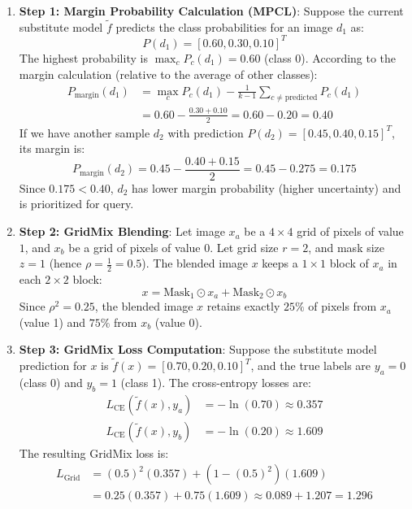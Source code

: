 \documentclass{article}
\begin{document}
\begin{enumerate}
    \item \textbf{Step 1: Margin Probability Calculation (MPCL)}: Suppose the current substitute model $\tilde{f}$ predicts the class probabilities for an image $d_1$ as:
    $$P(d_1) = [0.60, 0.30, 0.10]^T$$
    The highest probability is $\max_c P_c(d_1) = 0.60$ (class 0). 
    According to the margin calculation (relative to the average of other classes):
    \begin{align*}
        P_{\text{margin}}(d_1) &= \max_{c} P_c(d_1) - \frac{1}{k - 1} \sum_{c \neq \text{predicted}} P_c(d_1) \\
        &= 0.60 - \frac{0.30 + 0.10}{2} = 0.60 - 0.20 = 0.40
    \end{align*}
    If we have another sample $d_2$ with prediction $P(d_2) = [0.45, 0.40, 0.15]^T$, its margin is:
    $$P_{\text{margin}}(d_2) = 0.45 - \frac{0.40 + 0.15}{2} = 0.45 - 0.275 = 0.175$$
    Since $0.175 < 0.40$, $d_2$ has lower margin probability (higher uncertainty) and is prioritized for query.
    
    \item \textbf{Step 2: GridMix Blending}: Let image $x_a$ be a $4 \times 4$ grid of pixels of value $1$, and $x_b$ be a grid of pixels of value $0$. Let grid size $r=2$, and mask size $z=1$ (hence $\rho = \frac{1}{2} = 0.5$). 
    The blended image $x$ keeps a $1\times 1$ block of $x_a$ in each $2\times 2$ block:
    $$x = \text{Mask}_1 \odot x_a + \text{Mask}_2 \odot x_b$$
    Since $\rho^2 = 0.25$, the blended image $x$ retains exactly $25\%$ of pixels from $x_a$ (value 1) and $75\%$ from $x_b$ (value 0).
    
    \item \textbf{Step 3: GridMix Loss Computation}: Suppose the substitute model prediction for $x$ is $\tilde{f}(x) = [0.70, 0.20, 0.10]^T$, and the true labels are $y_a = 0$ (class 0) and $y_b = 1$ (class 1). The cross-entropy losses are:
    \begin{align*}
        L_{\text{CE}}(\tilde{f}(x), y_a) &= -\ln(0.70) \approx 0.357 \\
        L_{\text{CE}}(\tilde{f}(x), y_b) &= -\ln(0.20) \approx 1.609
    \end{align*}
    The resulting GridMix loss is:
    \begin{align*}
        L_{\text{Grid}} &= (0.5)^2 (0.357) + (1 - (0.5)^2) (1.609) \\
        &= 0.25(0.357) + 0.75(1.609) \approx 0.089 + 1.207 = 1.296
    \end{align*}
\end{enumerate}
\end{document}
